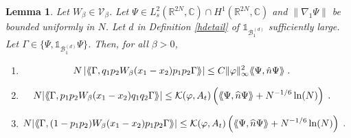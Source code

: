 \documentclass[11pt, english, american]{article}
\newcommand{\laa}{\langle\hspace{-0.08cm}\langle}
\newcommand{\raa}{\rangle\hspace{-0.08cm}\rangle}
\newtheorem{lemma}[theorem]{Lemma}
\renewcommand{\phi}{\varphi}
\begin{document}
\begin{lemma}\label{energie(1-pp)pp}%
Let $W_\beta \in \mathcal{V}_\beta$. 
Let 
$
\Psi \in 
 L^2_{s}(\mathbb{R}^{2N}, \mathbb{C})
 \cap
  H^1(\mathbb{R}^{2N}, \mathbb{C})
 $
 and $\|\nabla_1\Psi\|$ be bounded uniformly in $N$.
Let $d $ in Definition \ref{hdetail} of $\mathds{1}_{{\mathcal{B}_1^{(d)}}} $ sufficiently large.
Let $\Gamma \in \lbrace \Psi, \mathds{1}_{{\mathcal{B}_1^{(d)}}}  \Psi \rbrace$.
Then, for all $\beta >0$,
\begin{enumerate}
\item   
\begin{align*}
&N\left|\laa \Gamma, q_1p_2
W_\beta(x_1-x_2) p_1p_2 \Gamma\raa\right|\leq   C \|\phi \|_\infty^2
 \laa \Psi, \hat{n} \Psi \raa \;.
\end{align*}

\item  \begin{align*}
&N|\laa \Gamma ,
p_1p_2 W_\beta(x_1-x_2) q_1q_2 \Gamma\raa|  \leq
\mathcal{K}(\phi,A_t)
 \left(
\laa\Psi, \widehat{n} \Psi \raa
+
N^{-1/6} \ln(N)
\right)
\;.
\end{align*}

\item[(c)]
 \begin{align*}
&N|\laa \Gamma ,
(1-p_1p_2) W_\beta(x_1-x_2) p_1p_2 \Gamma\raa|  
\leq
\mathcal{K}(\phi,A_t)
 \left(
\laa\Psi, \widehat{n} \Psi \raa
+
N^{-1/6} \ln(N)
\right)
\;.
\end{align*}
\end{enumerate}
\end{lemma}
\end{document}
